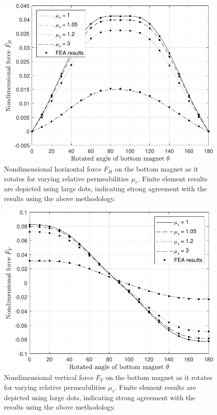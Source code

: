 \begin{figure}
	\centering
	\includegraphics[width=0.8\linewidth]{p4/p4FIG9}
	\caption{Nondimensional horizontal force \(F_H\) on the bottom magnet as it rotates for varying relative permeabilities \(\mu_r\). Finite element results are depicted using large dots, indicating strong agreement with the results using the above methodology.}
	\label{fig:p4cubeMagnetRotatedForcey}
\end{figure}
\begin{figure}
	\centering
	\includegraphics[width=0.8\linewidth]{p4/p4FIG10}
	\caption{Nondimensional vertical force \(F_V\) on the bottom magnet as it rotates for varying relative permeabilities \(\mu_r\). Finite element results are depicted using large dots, indicating strong agreement with the results using the above methodology.}
	\label{fig:p4cubeMagnetRotatedForcez}
\end{figure}
